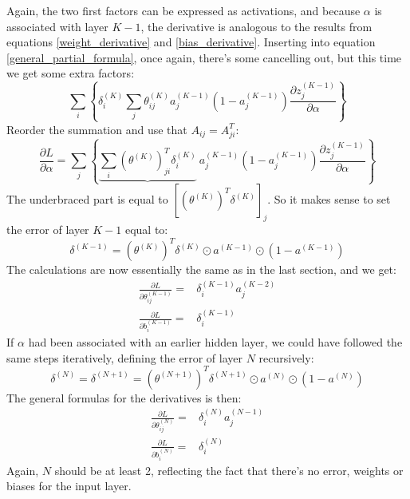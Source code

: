 \documentclass[12pt, a4paper]{article}
\numberwithin{equation}{section}
\begin{document}
Again, the two first factors can be expressed as activations, and because $\alpha$ is associated with layer $K-1$, the derivative is analogous to the results from equations \ref{weight_derivative} and \ref{bias_derivative}. Inserting into equation \ref{general_partial_formula}, once again, there's some cancelling out, but this time we get some extra factors:
\begin{equation}
\sum_i\left\{\delta^{(K)}_i\sum_j\theta^{(K)}_{ij}a_j^{(K-1)}\left(1-a_j^{(K-1)}\right)\frac{\partial z^{(K-1)}_j}{\partial\alpha}\right\}
\end{equation}
Reorder the summation and use that $A_{ij}=A^T_{ji}$:
\begin{equation}
\frac{\partial L}{\partial\alpha}=\sum_{j}\left\{\underbrace{\sum_i\left(\theta^{(K)}\right)^T_{ji}\delta^{(K)}_i}\ a_j^{(K-1)}\left(1-a_j^{(K-1)}\right)\frac{\partial z^{(K-1)}_j}{\partial\alpha}\right\}
\end{equation}
The underbraced part is equal to $\left[\left(\theta^{(K)}\right)^T\delta^{(K)}\right]_j$. So it makes sense to set the error of layer $K-1$ equal to:
\begin{equation}
\label{backpropagating_errors}
\delta^{(K-1)}=\left(\theta^{(K)}\right)^T\delta^{(K)}\odot a^{(K-1)}\odot\left(1-a^{(K-1)}\right)
\end{equation}
The calculations are now essentially the same as in the last section, and we get:
\begin{align}
\frac{\partial L}{\partial\theta^{(K-1)}_{ij}}=&\delta^{(K-1)}_i a^{(K-2)}_j\\
\frac{\partial L}{\partial b^{(K-1)}_i}=&\delta^{(K-1)}_i
\end{align}
If $\alpha$ had been associated with an earlier hidden layer, we could have followed the same steps iteratively, defining the error of layer $N$ recursively:
\begin{equation}
\delta^{(N)}=\delta^{(N+1)}=\left(\theta^{(N+1)}\right)^T\delta^{(N+1)}\odot a^{(N)}\odot\left(1-a^{(N)}\right)
\end{equation}
The general formulas for the derivatives is then:
\begin{align}
\frac{\partial L}{\partial\theta^{(N)}_{ij}}=&\delta^{(N)}_i a^{(N-1)}_j\\
\frac{\partial L}{\partial b^{(N)}_i}=&\delta^{(N)}_i
\end{align}
Again, $N$ should be at least 2, reflecting the fact that there's no error, weights or biases for the input layer.
\end{document}
